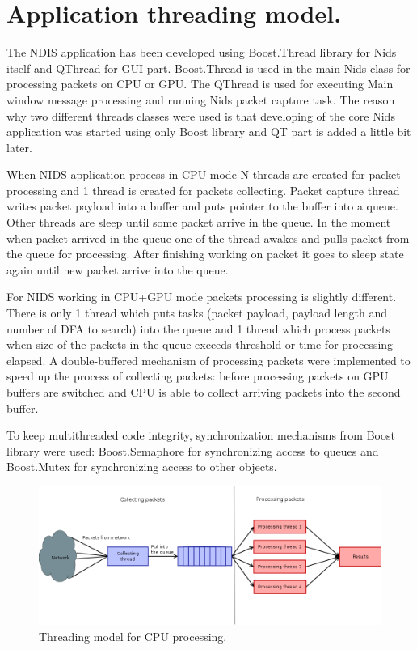 \documentclass[thesis=M,english]{FITthesis}[2011/07/15]
\begin{document}
\section{Application threading model.}
The NDIS application has been developed using Boost.Thread library for Nids itself and QThread for GUI part. Boost.Thread is used in the main Nids class for processing packets on CPU or GPU. The QThread is used for executing Main window message processing and running Nids packet capture task. The reason why two different threads classes were used is that developing of the core Nids application was started using only Boost library and QT part is added a little bit later.

When NIDS application process in CPU mode N threads are created for packet processing and 1 thread is created for packets collecting. Packet capture thread writes packet payload into a buffer and puts pointer to the buffer into a queue. Other threads are sleep until some packet arrive in the queue. In the moment when packet arrived in the queue one of the thread awakes and pulls packet from the queue for processing. After finishing working on packet it goes to sleep state again until new packet arrive into the queue.

For NIDS working in CPU+GPU mode packets processing is slightly different. There is only 1 thread which puts tasks (packet payload, payload length and number of DFA to search) into the queue and 1 thread which process packets when size of the packets in the queue exceeds threshold or time for processing elapsed. A double-buffered mechanism of processing packets were implemented to speed up the process of collecting packets: before processing packets on GPU buffers are switched and CPU is able to collect arriving packets into the second buffer.

To keep multithreaded code integrity, synchronization mechanisms from Boost library were used: Boost.Semaphore for synchronizing access to queues and Boost.Mutex for synchronizing access to other objects.

\begin{figure}
\centering
\includegraphics[scale=0.3]{images/cpu_threads.png}
\caption{Threading model for CPU processing.}
\label{fig:cpu_threads}
\end{figure}
\end{document}
